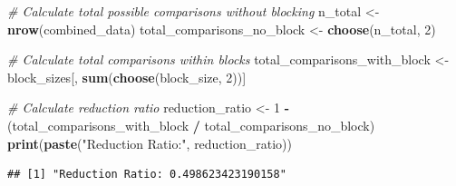 \documentclass[
]{article}
\newenvironment{Shaded}{\begin{snugshade}}{\end{snugshade}}
\newcommand{\CommentTok}[1]{\textcolor[rgb]{0.56,0.35,0.01}{\textit{#1}}}
\newcommand{\DecValTok}[1]{\textcolor[rgb]{0.00,0.00,0.81}{#1}}
\newcommand{\FunctionTok}[1]{\textcolor[rgb]{0.13,0.29,0.53}{\textbf{#1}}}
\newcommand{\NormalTok}[1]{#1}
\newcommand{\OtherTok}[1]{\textcolor[rgb]{0.56,0.35,0.01}{#1}}
\newcommand{\SpecialCharTok}[1]{\textcolor[rgb]{0.81,0.36,0.00}{\textbf{#1}}}
\newcommand{\StringTok}[1]{\textcolor[rgb]{0.31,0.60,0.02}{#1}}
\begin{document}
\begin{Shaded}
\begin{Highlighting}[]
\CommentTok{\# Calculate total possible comparisons without blocking}
\NormalTok{n\_total }\OtherTok{\textless{}{-}} \FunctionTok{nrow}\NormalTok{(combined\_data)}
\NormalTok{total\_comparisons\_no\_block }\OtherTok{\textless{}{-}} \FunctionTok{choose}\NormalTok{(n\_total, }\DecValTok{2}\NormalTok{)}

\CommentTok{\# Calculate total comparisons within blocks}
\NormalTok{total\_comparisons\_with\_block }\OtherTok{\textless{}{-}}\NormalTok{ block\_sizes[, }\FunctionTok{sum}\NormalTok{(}\FunctionTok{choose}\NormalTok{(block\_size, }\DecValTok{2}\NormalTok{))]}

\CommentTok{\# Calculate reduction ratio}
\NormalTok{reduction\_ratio }\OtherTok{\textless{}{-}} \DecValTok{1} \SpecialCharTok{{-}}\NormalTok{ (total\_comparisons\_with\_block }\SpecialCharTok{/}\NormalTok{ total\_comparisons\_no\_block)}
\FunctionTok{print}\NormalTok{(}\FunctionTok{paste}\NormalTok{(}\StringTok{"Reduction Ratio:"}\NormalTok{, reduction\_ratio))}
\end{Highlighting}
\end{Shaded}

\begin{verbatim}
## [1] "Reduction Ratio: 0.498623423190158"
\end{verbatim}

\hfill\break
\end{document}

